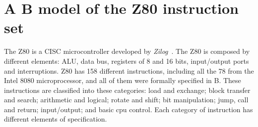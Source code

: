 \documentclass[a4paper]{llncs}
\begin{document}
\section{A B model of the Z80 instruction set}
\label{sec:z80}

The Z80 is a CISC microcontroller developed by \textit{Zilog}~\cite{Z80_manual}. 
The Z80 is composed by different elements: ALU, data bus, registers of 8 and 16
bits, input/output ports and interruptions. Z80 has 158 different instructions, 
including all the 78 from the Intel 8080 microprocessor, and all of them were
formally specified in B. These instructions are classified into these categories: load and
exchange; block transfer and search; arithmetic and logical; rotate
and shift; bit manipulation; jump, call and return; input/output; and
basic cpu control. Each category of instruction has different elements
of specification.
\end{document}
